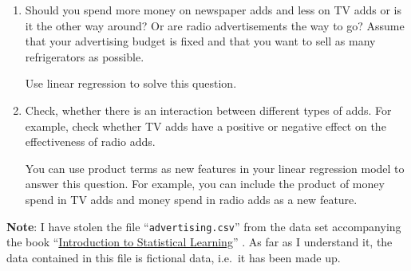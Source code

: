 \begin{enumerate}
\item Should you spend more money on newspaper adds and less on TV adds or is it the other way around?  Or are radio
      advertisements the way to go? Assume that your advertising budget is fixed and that you want to sell as many
      refrigerators as possible.  

      Use linear regression to solve this question.
\item Check, whether there is an interaction between different types of adds.  For example, check whether TV
      adds have a positive or negative effect on the effectiveness of radio adds.

      You can use product terms as new features in your linear regression model to answer this question.
      For example, you can include the product of money spend in TV adds and money spend in radio adds as a new
      feature.
\end{enumerate}
\vspace*{0.2cm}

\noindent
\textbf{Note}:  I have stolen the file ``\texttt{advertising.csv}'' from the data set accompanying the book
``\href{http://www-bcf.usc.edu/~gareth/ISL/index.html}{Introduction to Statistical Learning}''
\cite{james:2014}.  As far as I understand it, the data contained in this file is fictional data, i.e.~it
has been made up. 
\eox

